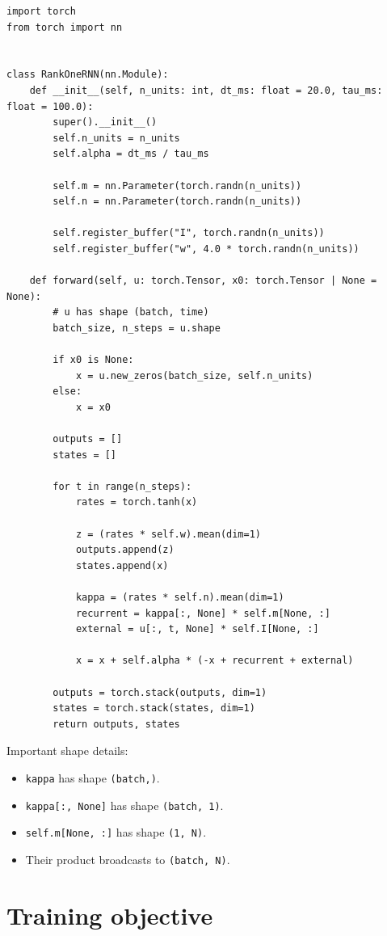 \documentclass[11pt]{article}
\begin{document}
\begin{lstlisting}[style=python]
import torch
from torch import nn


class RankOneRNN(nn.Module):
    def __init__(self, n_units: int, dt_ms: float = 20.0, tau_ms: float = 100.0):
        super().__init__()
        self.n_units = n_units
        self.alpha = dt_ms / tau_ms

        self.m = nn.Parameter(torch.randn(n_units))
        self.n = nn.Parameter(torch.randn(n_units))

        self.register_buffer("I", torch.randn(n_units))
        self.register_buffer("w", 4.0 * torch.randn(n_units))

    def forward(self, u: torch.Tensor, x0: torch.Tensor | None = None):
        # u has shape (batch, time)
        batch_size, n_steps = u.shape

        if x0 is None:
            x = u.new_zeros(batch_size, self.n_units)
        else:
            x = x0

        outputs = []
        states = []

        for t in range(n_steps):
            rates = torch.tanh(x)

            z = (rates * self.w).mean(dim=1)
            outputs.append(z)
            states.append(x)

            kappa = (rates * self.n).mean(dim=1)
            recurrent = kappa[:, None] * self.m[None, :]
            external = u[:, t, None] * self.I[None, :]

            x = x + self.alpha * (-x + recurrent + external)

        outputs = torch.stack(outputs, dim=1)
        states = torch.stack(states, dim=1)
        return outputs, states
\end{lstlisting}

Important shape details:
\begin{itemize}
  \item \texttt{kappa} has shape \texttt{(batch,)}.
  \item \texttt{kappa[:, None]} has shape \texttt{(batch, 1)}.
  \item \texttt{self.m[None, :]} has shape \texttt{(1, N)}.
  \item Their product broadcasts to \texttt{(batch, N)}.
\end{itemize}

\section{Training objective}
\end{document}
